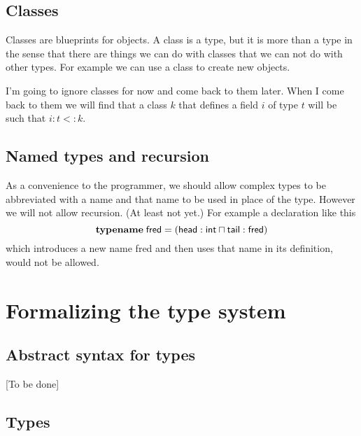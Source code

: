\documentclass[12pt]{article}
\begin{document}
\subsection{Classes}

Classes are blueprints for objects. A class is a type, but it is more than a
type in the sense that there are things we can do with classes that we can
not do with other types. For example we can use a class to create new
objects.

I'm going to ignore classes for now and come back to them later. When I come
back to them we will find that a class $k$ that defines a field $i$ of type $%
t$ will be such that $i\colon t<:k$.

\subsection{Named types and recursion}

As a convenience to the programmer, we should allow complex types to be
abbreviated with a name and that name to be used in place of the type.
However we will not allow recursion. (At least not yet.) For example a
declaration like this%
\begin{equation*}
\mathbf{typename}\;\mathsf{fred}=(\mathsf{head}:\mathsf{int}\sqcap \mathsf{%
tail}:\mathsf{fred)}
\end{equation*}%
which introduces a new name \textsf{fred} and then uses that name in its
definition, would not be allowed.

\section{Formalizing the type system}

\subsection{Abstract syntax for types}

[To be done]

\subsection{Types}
\end{document}
